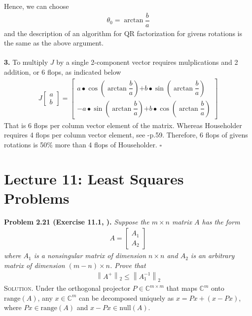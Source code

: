 \documentclass[a4paper,oneside]{book}
\numberwithin{equation}{chapter}
\begin{document}
Hence, we can choose
\begin{align}
{\theta _0} = {\arctan \dfrac{b}{a}}
\end{align}
and the description of an algorithm for QR factorization for givens rotations is the same as the above argument.\\
\\
\textbf{3.} To multiply $J$ by a single 2-component vector requires mulplications and 2 addition, or 6 flops, as indicated below
\begin{align}
J\left[ {\begin{array}{*{20}{c}}
a\\
b
\end{array}} \right] = \left[ {\begin{array}{*{20}{c}}
{a \bullet \cos \left( {\arctan \dfrac{b}{a}} \right) \pmb{+} b \bullet \sin \left( {\arctan \dfrac{b}{a}} \right)}\\
{ - a \bullet \sin \left( {\arctan \dfrac{b}{a}} \right) \pmb{+} b \bullet \cos \left( {\arctan \dfrac{b}{a}} \right)}
\end{array}} \right]
\end{align}
That is 6 flops per column vector element of the matrix. Whereas Householder requires 4 flops per column vector element, see \cite{1}-p.59. Therefore, 6 flops of givens rotations is 50\% more than 4 flops of Householder. \hfill $\square$\\
\section{Lecture 11: Least Squares Problems}
\textbf{Problem 2.21 (Exercise 11.1, \cite{1}).} \textit{Suppose the $m\times n$ matrix $A$ has the form}
\begin{align}
A = \left[ {\begin{array}{*{20}{c}}
{{A_1}}\\
{{A_2}}
\end{array}} \right]
\end{align}
\textit{where $A_1$ is a nonsingular matrix of dimension $n\times n$ and $A_2$ is an arbitrary matrix of dimension $\left(m-n\right)\times n$. Prove that}
\begin{align}
{\left\| {{A^ + }} \right\|_2} \le {\left\| {A_1^{ - 1}} \right\|_2}
\end{align}
\textsc{Solution.} Under the orthogonal projector $P \in \mathbb{C}^{m\times m}$ that maps $\mathbb{C}^m$ onto $\mbox{range}\left(A\right)$, any $x\in \mathbb{C}^m$ can be decomposed uniquely as $x=Px+\left(x-Px\right)$, where $Px \in \mbox{range}\left(A\right)$ and $x-Px \in \mbox{null}\left(A\right)$.
\end{document}

